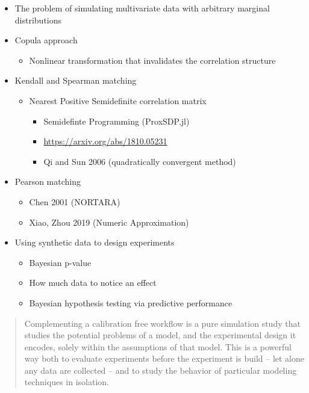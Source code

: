 \documentclass[11pt, oneside, openany]{scrbook}
\providecommand{\tightlist}{%
  \setlength{\itemsep}{0pt}\setlength{\parskip}{0pt}}
\begin{document}
\begin{itemize}
\tightlist
\item
  The problem of simulating multivariate data with arbitrary marginal distributions
\item
  Copula approach

  \begin{itemize}
  \tightlist
  \item
    Nonlinear transformation that invalidates the correlation structure
  \end{itemize}
\item
  Kendall and Spearman matching

  \begin{itemize}
  \tightlist
  \item
    Nearest Positive Semidefinite correlation matrix

    \begin{itemize}
    \tightlist
    \item
      Semidefinte Programming (ProxSDP.jl)
    \item
      \url{https://arxiv.org/abs/1810.05231}
    \item
      Qi and Sun 2006 (quadratically convergent method)
    \end{itemize}
  \end{itemize}
\item
  Pearson matching

  \begin{itemize}
  \tightlist
  \item
    Chen 2001 (NORTARA)
  \item
    Xiao, Zhou 2019 (Numeric Approximation)
  \end{itemize}
\item
  Using synthetic data to design experiments

  \begin{itemize}
  \tightlist
  \item
    Bayesian p-value
  \item
    How much data to notice an effect
  \item
    Bayesian hypothesis testing via predictive performance
  \end{itemize}
\end{itemize}

\begin{quote}
Complementing a calibration free workflow is a pure simulation study that studies the potential problems of a model, and the experimental design it encodes, solely within the assumptions of that model. This is a powerful way both to evaluate experiments before the experiment is build -- let alone any data are collected -- and to study the behavior of particular modeling techniques in isolation.
\end{quote}
\end{document}
